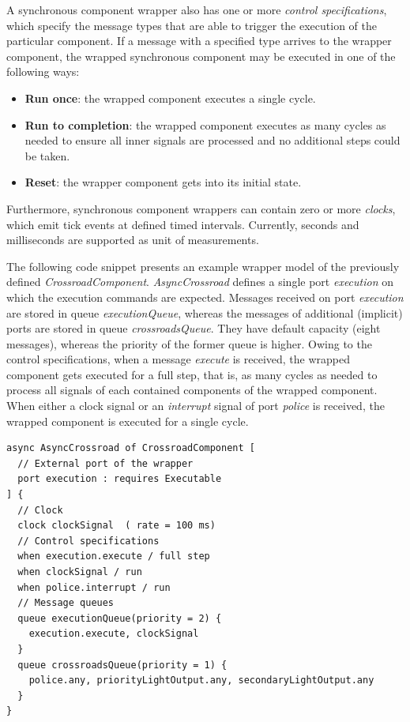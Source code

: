 A synchronous component wrapper also has one or more \emph{control specifications}, which
specify the message types that are able to trigger the execution of the particular component.
If a message with a specified type arrives to the wrapper component, the wrapped synchronous
component may be executed in one of the following ways:
\begin{itemize}
	\item \textbf{Run once}: the wrapped component executes a single cycle.
	\item \textbf{Run to completion}: the wrapped component executes as many cycles as needed to
	ensure all inner signals are processed and no additional steps could be taken.
	\item \textbf{Reset}: the wrapper component gets into its initial state.
\end{itemize}

Furthermore, synchronous component wrappers can contain zero or more \emph{clocks}, which emit tick
events at defined timed intervals. Currently, seconds and milliseconds are supported as unit of measurements.

The following code snippet presents an example wrapper model of the previously defined \textsl{CrossroadComponent}. \textsl{AsyncCrossroad} defines a single port \textsl{execution} on which the execution commands
are expected. Messages received on port \textsl{execution} are stored in queue \textsl{executionQueue}, whereas
the messages of additional (implicit) ports are stored in queue \textsl{crossroadsQueue}. They have default capacity (eight messages), whereas the priority of
the former queue is higher. Owing to the control specifications, when a message \textsl{execute} is received,
the wrapped component gets executed for a full step, that is, as many cycles as needed to
process all signals of each contained components of the wrapped component. When either
a clock signal or an \textsl{interrupt} signal of port \textsl{police} is received, the wrapped
component is executed for a single cycle.
\begin{lstlisting}
async AsyncCrossroad of CrossroadComponent [
  // External port of the wrapper
  port execution : requires Executable
] {
  // Clock
  clock clockSignal  ( rate = 100 ms)
  // Control specifications
  when execution.execute / full step
  when clockSignal / run
  when police.interrupt / run
  // Message queues
  queue executionQueue(priority = 2) {
    execution.execute, clockSignal
  }
  queue crossroadsQueue(priority = 1) {
    police.any, priorityLightOutput.any, secondaryLightOutput.any
  }
}
\end{lstlisting}

